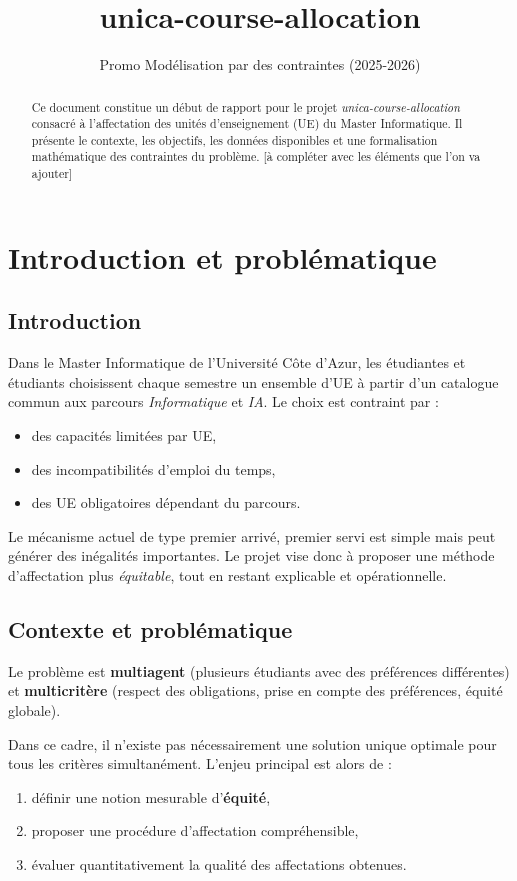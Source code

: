 \documentclass{rapport}
\title{unica-course-allocation}
\author{Promo Modélisation par des contraintes (2025-2026)}
\date{}
\theoremstyle{definition}
\theoremstyle{remark}
\theoremstyle{plain}
\theoremstyle{definition}
\theoremstyle{remark}
\begin{document}
\maketitle

\begin{abstract}
Ce document constitue un début de rapport pour le projet \emph{unica-course-allocation} consacré à l'affectation des unités d'enseignement (UE) du Master Informatique. Il présente le contexte, les objectifs, les données disponibles et une formalisation mathématique des contraintes du problème. [à compléter avec les éléments que l'on va ajouter]
\end{abstract}

\clearpage
\tableofcontents
\clearpage

\section{Introduction et problématique}
\subsection{Introduction}
Dans le Master Informatique de l'Université Côte d'Azur, les étudiantes et étudiants choisissent chaque semestre un ensemble d'UE à partir d'un catalogue commun aux parcours \emph{Informatique} et \emph{IA}. Le choix est contraint par :
\begin{itemize}
    \item des capacités limitées par UE,
    \item des incompatibilités d'emploi du temps,
    \item des UE obligatoires dépendant du parcours.
\end{itemize}

Le mécanisme actuel de type \og premier arrivé, premier servi \fg{} est simple mais peut générer des inégalités importantes. Le projet vise donc à proposer une méthode d'affectation plus \emph{équitable}, tout en restant explicable et opérationnelle.

\subsection{Contexte et problématique}
Le problème est \textbf{multiagent} (plusieurs étudiants avec des préférences différentes) et \textbf{multicritère} (respect des obligations, prise en compte des préférences, équité globale).

Dans ce cadre, il n'existe pas nécessairement une solution unique optimale pour tous les critères simultanément. L'enjeu principal est alors de :
\begin{enumerate}
    \item définir une notion mesurable d'\textbf{équité},
    \item proposer une procédure d'affectation compréhensible,
    \item évaluer quantitativement la qualité des affectations obtenues.
\end{enumerate}
\end{document}
